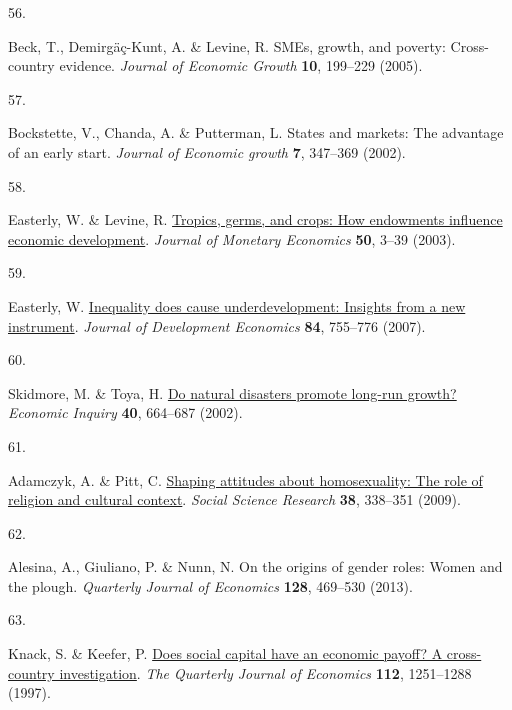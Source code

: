 \documentclass[
  man,floatsintext]{apa6}
\newlength{\cslhangindent}
\newlength{\csllabelwidth}
\newlength{\cslentryspacingunit} %
\newenvironment{CSLReferences}[2] %
 {%
  \setlength{\parindent}{0pt}
  \ifodd #1
  \let\oldpar\par
  \def\par{\hangindent=\cslhangindent\oldpar}
  \fi
  \setlength{\parskip}{#2\cslentryspacingunit}
 }%
 {}
\newcommand{\CSLLeftMargin}[1]{\parbox[t]{\csllabelwidth}{#1}}
\newcommand{\CSLRightInline}[1]{\parbox[t]{\linewidth - \csllabelwidth}{#1}\break}
\begin{document}
\begin{CSLReferences}{0}{0}
\leavevmode{}%
\CSLLeftMargin{56. }%
\CSLRightInline{Beck, T., Demirgäç-Kunt, A. \& Levine, R. {SME}s, growth, and poverty: Cross-country evidence. \emph{Journal of Economic Growth} \textbf{10}, 199--229 (2005).}

\leavevmode{}%
\CSLLeftMargin{57. }%
\CSLRightInline{Bockstette, V., Chanda, A. \& Putterman, L. States and markets: The advantage of an early start. \emph{Journal of Economic growth} \textbf{7}, 347--369 (2002).}

\leavevmode{}%
\CSLLeftMargin{58. }%
\CSLRightInline{Easterly, W. \& Levine, R. \href{https://doi.org/10.1016/S0304-3932(02)00200-3}{Tropics, germs, and crops: How endowments influence economic development}. \emph{Journal of Monetary Economics} \textbf{50}, 3--39 (2003).}

\leavevmode{}%
\CSLLeftMargin{59. }%
\CSLRightInline{Easterly, W. \href{https://doi.org/10.1016/j.jdeveco.2006.11.002}{Inequality does cause underdevelopment: Insights from a new instrument}. \emph{Journal of Development Economics} \textbf{84}, 755--776 (2007).}

\leavevmode{}%
\CSLLeftMargin{60. }%
\CSLRightInline{Skidmore, M. \& Toya, H. \href{https://doi.org/10.1093/ei/40.4.664}{Do natural disasters promote long-run growth?} \emph{Economic Inquiry} \textbf{40}, 664--687 (2002).}

\leavevmode{}%
\CSLLeftMargin{61. }%
\CSLRightInline{Adamczyk, A. \& Pitt, C. \href{https://doi.org/10.1016/j.ssresearch.2009.01.002}{Shaping attitudes about homosexuality: The role of religion and cultural context}. \emph{Social Science Research} \textbf{38}, 338--351 (2009).}

\leavevmode{}%
\CSLLeftMargin{62. }%
\CSLRightInline{Alesina, A., Giuliano, P. \& Nunn, N. On the origins of gender roles: Women and the plough. \emph{Quarterly Journal of Economics} \textbf{128}, 469--530 (2013).}

\leavevmode{}%
\CSLLeftMargin{63. }%
\CSLRightInline{Knack, S. \& Keefer, P. \href{https://doi.org/10.1162/003355300555475}{Does social capital have an economic payoff? A cross-country investigation}. \emph{The Quarterly Journal of Economics} \textbf{112}, 1251--1288 (1997).}


\end{CSLReferences}
\end{document}
